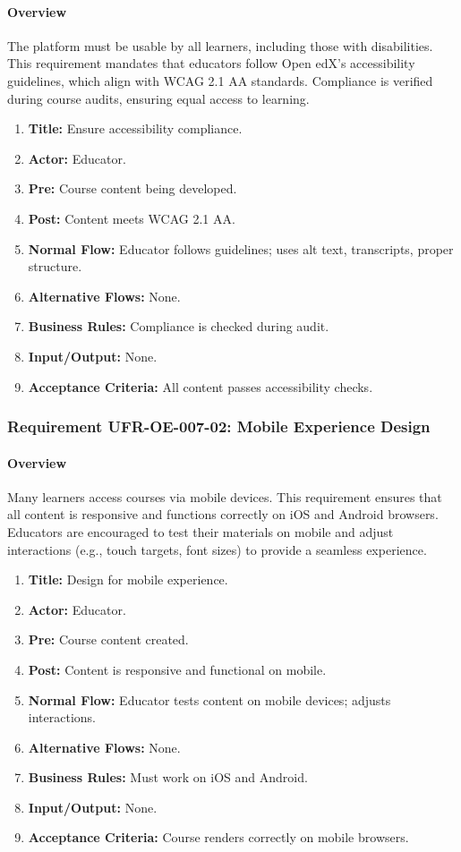 \paragraph{Overview}
The platform must be usable by all learners, including those with disabilities. This requirement mandates that educators follow Open edX’s accessibility guidelines, which align with WCAG 2.1 AA standards. Compliance is verified during course audits, ensuring equal access to learning.
\begin{enumerate}[label=\textbf{\arabic*.}]
\item \textbf{Title:} Ensure accessibility compliance.
\item \textbf{Actor:} Educator.
\item \textbf{Pre:} Course content being developed.
\item \textbf{Post:} Content meets WCAG 2.1 AA.
\item \textbf{Normal Flow:} Educator follows guidelines; uses alt text, transcripts, proper structure.
\item \textbf{Alternative Flows:} None.
\item \textbf{Business Rules:} Compliance is checked during audit.
\item \textbf{Input/Output:} None.
\item \textbf{Acceptance Criteria:} All content passes accessibility checks.
\end{enumerate}

\subsubsection{Requirement UFR-OE-007-02: Mobile Experience Design}
\paragraph{Overview}
Many learners access courses via mobile devices. This requirement ensures that all content is responsive and functions correctly on iOS and Android browsers. Educators are encouraged to test their materials on mobile and adjust interactions (e.g., touch targets, font sizes) to provide a seamless experience.
\begin{enumerate}[label=\textbf{\arabic*.}]
\item \textbf{Title:} Design for mobile experience.
\item \textbf{Actor:} Educator.
\item \textbf{Pre:} Course content created.
\item \textbf{Post:} Content is responsive and functional on mobile.
\item \textbf{Normal Flow:} Educator tests content on mobile devices; adjusts interactions.
\item \textbf{Alternative Flows:} None.
\item \textbf{Business Rules:} Must work on iOS and Android.
\item \textbf{Input/Output:} None.
\item \textbf{Acceptance Criteria:} Course renders correctly on mobile browsers.
\end{enumerate}

